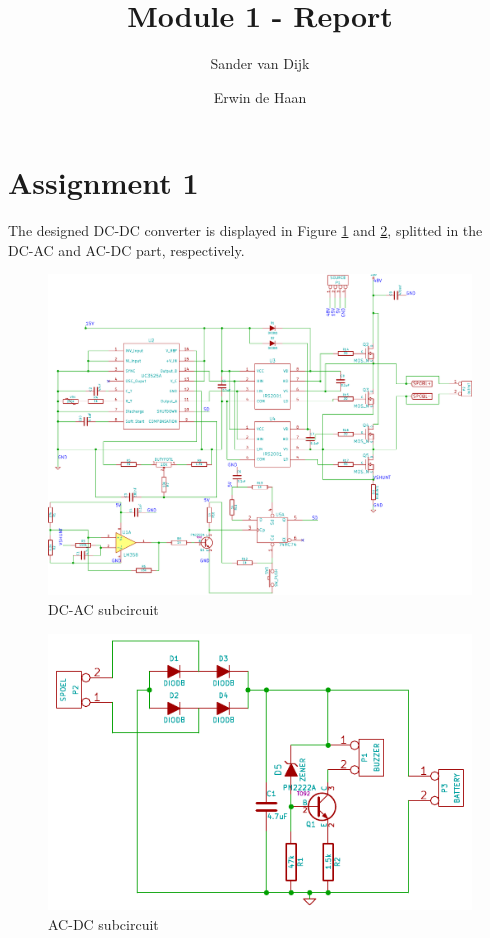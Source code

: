 \documentclass[final]{scrreprt} %
\title{Module 1 - Report}
\author{Sander {van Dijk} \and Erwin {de Haan}}
\begin{document}
\chapter*{Assignment 1}
The designed DC-DC converter is displayed in Figure \ref{fig:DC-AC} and \ref{fig:AC-DC}, splitted in the DC-AC and AC-DC part, respectively.

\begin{figure}[h]
	\includegraphics[width=\linewidth]{resources/DC-AC-rc.pdf}
	\caption{DC-AC subcircuit}
	\label{fig:DC-AC}
\end{figure}

\begin{figure}[h]
	\includegraphics[width=\linewidth]{resources/AC-DC-rc.pdf}
	\caption{AC-DC subcircuit}
	\label{fig:AC-DC}
\end{figure}
\end{document}
